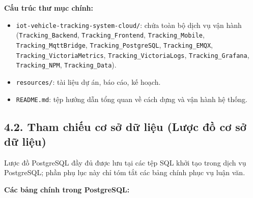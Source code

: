 \documentclass[a4paper]{extarticle}
\providecommand{\tightlist}{%
  \setlength{\itemsep}{0pt}\setlength{\parskip}{0pt}}
\begin{document}
\textbf{Cấu trúc thư mục chính:}

\begin{itemize}
\tightlist
\item
  \texttt{iot-vehicle-tracking-system-cloud/}: chứa toàn bộ dịch vụ vận hành
  (\texttt{Tracking\_Backend}, \texttt{Tracking\_Frontend},
  \texttt{Tracking\_Mobile}, \texttt{Tracking\_MqttBridge},
  \texttt{Tracking\_PostgreSQL}, \texttt{Tracking\_EMQX},
  \texttt{Tracking\_VictoriaMetrics}, \texttt{Tracking\_VictoriaLogs},
  \texttt{Tracking\_Grafana}, \texttt{Tracking\_NPM},
  \texttt{Tracking\_Data}).
\item
  \texttt{resources/}: tài liệu dự án, báo cáo, kế hoạch.
\item
  \texttt{README.md}: tệp hướng dẫn tổng quan về cách dựng và vận hành hệ
  thống.
\end{itemize}

\subsection{4.2. Tham chiếu cơ sở dữ liệu (Lược đồ cơ
sở dữ liệu)}\label{42-tham-chiux1ebfu-cux1a1-sux1edf-dux1eef-liux1ec7u-database-schema}

Lược đồ PostgreSQL đầy đủ được lưu tại các tệp SQL khởi tạo trong dịch vụ
PostgreSQL; phần phụ lục này chỉ tóm tắt các bảng chính phục vụ luận
văn.

\textbf{Các bảng chính trong PostgreSQL:}
\end{document}
